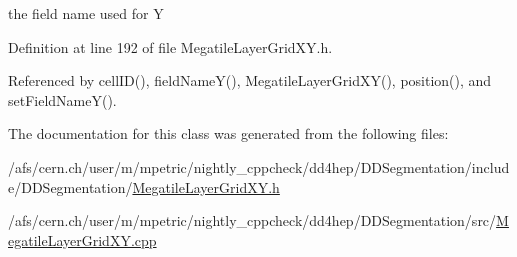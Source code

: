 the field name used for Y 

Definition at line 192 of file MegatileLayerGridXY.h.

Referenced by cellID(), fieldNameY(), MegatileLayerGridXY(), position(), and setFieldNameY().

The documentation for this class was generated from the following files:\begin{DoxyCompactItemize}
\item 
/afs/cern.ch/user/m/mpetric/nightly\_\-cppcheck/dd4hep/DDSegmentation/include/DDSegmentation/\hyperlink{_megatile_layer_grid_x_y_8h}{MegatileLayerGridXY.h}\item 
/afs/cern.ch/user/m/mpetric/nightly\_\-cppcheck/dd4hep/DDSegmentation/src/\hyperlink{_megatile_layer_grid_x_y_8cpp}{MegatileLayerGridXY.cpp}\end{DoxyCompactItemize}
